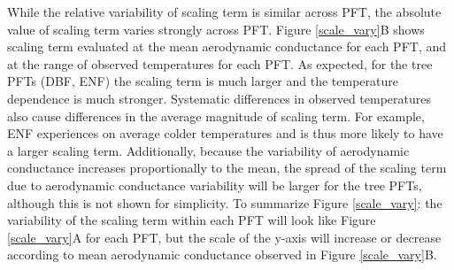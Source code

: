\documentclass[draft,linenumbers]{agujournal}
\begin{document}
While the relative variability of scaling term is similar across PFT, the absolute value of scaling term varies strongly across PFT. Figure \ref{scale_vary}B shows scaling term evaluated at the mean aerodynamic conductance for each PFT, and at the range of observed temperatures for each PFT. As expected, for the tree PFTs (DBF, ENF) the scaling term is much larger and the temperature dependence is much stronger. Systematic differences in observed temperatures also cause differences in the average magnitude of scaling term. For example, ENF experiences on average colder temperatures and is thus more likely to have a larger scaling term. Additionally, because the variability of aerodynamic conductance increases proportionally to the mean, the spread of the scaling term due to aerodynamic conductance variability will be larger for the tree PFTs, although this is not shown for simplicity. To summarize Figure \ref{scale_vary}: the variability of the scaling term within each PFT will look like Figure \ref{scale_vary}A for each PFT, but the scale of the y-axis will increase or decrease according to mean aerodynamic conductance observed in Figure \ref{scale_vary}B.
 
\end{document}
